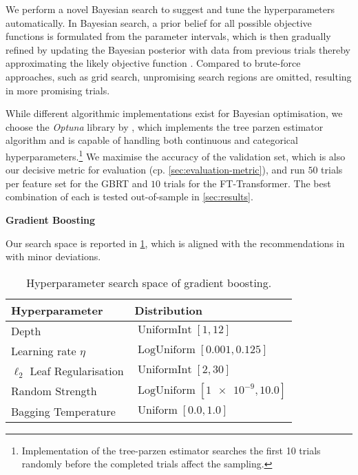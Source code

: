 We perform a novel Bayesian search to suggest and tune the hyperparameters automatically. In Bayesian search, a prior belief for all possible objective functions is formulated from the parameter intervals, which is then gradually refined by updating the Bayesian posterior with data from previous trials thereby approximating the likely objective function \autocite[][2]{shahriariTakingHumanOut2016}. Compared to brute-force approaches, such as grid search, unpromising search regions are omitted, resulting in more promising trials.

While different algorithmic implementations exist for Bayesian optimisation, we choose the \emph{Optuna} library by \textcite[][1--10]{akibaOptunaNextgenerationHyperparameter2019}, which implements the tree parzen estimator algorithm and is capable of handling both continuous and categorical hyperparameters.\footnote{Implementation of the tree-parzen estimator searches the first 10 trials randomly before the completed trials affect the sampling.} We maximise the accuracy of the validation set, which is also our decisive metric for evaluation (cp. \cref{sec:evaluation-metric}), and run $\num{50}$ trials per feature set for the \gls{GBRT} and $\num{10}$ trials for the FT-Transformer. The best combination of each is tested out-of-sample in \cref{sec:results}.

\textbf{Gradient Boosting}

Our search space is reported in \cref{tab:hyperparameter-space-gbm}, which is aligned with the recommendations in \textcites[][20]{prokhorenkovaCatBoostUnbiasedBoosting2018}[][18]{gorishniyRevisitingDeepLearning2021}[][4]{rubachevRevisitingPretrainingObjectives2022} with minor deviations.

\begin{table}[!h]
    \centering
    \caption[Hyperparameter Search Space of Gradient Boosting]{Hyperparameter search space of gradient boosting.}
    \label{tab:hyperparameter-space-gbm}
    \begin{tabular}{@{}ll@{}}
        \toprule
        Hyperparameter               & Distribution                                  \\ \midrule
        Depth                        & $\operatorname{UniformInt}[1,12]$             \\
        Learning rate $\eta$         & $\operatorname{LogUniform}[0.001, 0.125]$     \\
        $\ell_2$ Leaf Regularisation & $\operatorname{UniformInt}[2, 30]$            \\
        Random Strength              & $\operatorname{LogUniform}[\num{1e-9}, 10.0]$ \\
        Bagging Temperature          & $\operatorname{Uniform}[0.0, 1.0]$            \\ \bottomrule
    \end{tabular}
\end{table}

